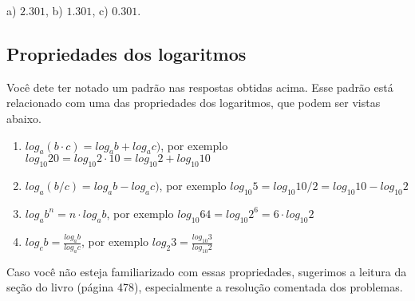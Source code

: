 \documentclass[main.tex]{subfiles}
\begin{document}
\begin{gabarito}
	\begin{gabaritoQuestao}
		a) $2.301$, b) $1.301$, c) $0.301$.
	\end{gabaritoQuestao}
\end{gabarito}

\subsection*{Propriedades dos logaritmos}

Você dete ter notado um padrão nas respostas obtidas acima. Esse padrão está relacionado com uma das propriedades dos logaritmos, que podem ser vistas abaixo.

\begin{caixaExemplo}
\begin{enumerate}
 \item $log_a (b \cdot c) = log_a b + log_a c)$, por exemplo $log_{10} 20 = log_{10} 2 \cdot 10 = log_{10} 2 + log_{10} 10$
 \item $log_a (b/c) = log_a b - log_a c)$, por exemplo $log_{10} 5 = log_{10} 10/2 = log_{10} 10 - log_{10} 2$
 \item $log_a b^n = n \cdot log_a b$, por exemplo $log_{10} 64 = log_{10} 2^6 = 6 \cdot log_{10} 2$
 \item $log_c b = \frac{log_a b}{log_a c}$, por exemplo $log_2 3 = \frac{log_{10} 3}{log_{10} 2}$
\end{enumerate}
\end{caixaExemplo}

Caso você não esteja familiarizado com essas propriedades, sugerimos a leitura da seção  do livro  (página 478), especialmente a resolução comentada dos problemas.
\end{document}
